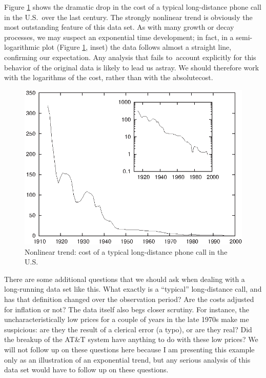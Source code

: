 Figure \ref{fig:phonecost} shows the dramatic drop in the cost of a
typical long-distance phone call in the U.S.\ over the last century.
The strongly nonlinear trend is obviously the most outstanding feature
of this data set. As with many growth or decay processes, we may
suspect an exponential time development; in fact, in a
semi-logarithmic plot (Figure \ref{fig:phonecost}, inset) the data
follows almost a straight line, confirming our expectation. Any
analysis that fails to~account explicitly for this behavior of the
original data is likely to lead us astray. We should therefore work
with the logarithms of the cost, rather than with the absolute\break cost.

\begin{figure}
  \centerline{\includegraphics{img/phonecost}}
  \caption{Nonlinear trend: cost of a typical long-distance phone call
    in the U.S.}
  \label{fig:phonecost}
\end{figure}

There are some additional questions that we should ask when dealing
with a long-running data set like this.  What exactly is a ``typical''
long-distance call, and has that definition changed over the
observation period?  Are the costs adjusted for inflation or not? The
data itself also begs closer scrutiny. For instance, the
uncharacteristically low prices for a couple of years in the late
1970s make me suspicious: are they the result of a clerical error (a
typo), or are they real? Did the breakup of the AT\&T system\vadjust{\pagebreak} have
anything to do with these low prices? We will not follow up on these
questions here because I am presenting this example only as an
illustration of an exponential trend, but any serious analysis of this
data set would have to follow up on these questions.

